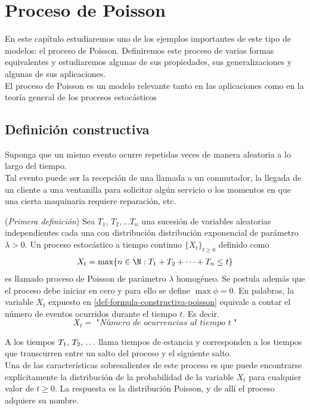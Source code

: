 \section{Proceso de Poisson}
\label{procPoisson-chapter}
En este capítulo estudiaremos uno de los ejemplos
importantes de este tipo de modelos: el proceso de Poisson. Definiremos este proceso de varias formas equivalentes y estudiaremos algunas de sus propiedades, sus generalizaciones y algunas de sus aplicaciones. \\
El proceso de Poisson es un modelo relevante tanto en las aplicaciones como en la teoría general de los procesos estocásticos
\subsection{Definición constructiva}
    Suponga que un mismo evento ocurre repetidas veces de manera aleatoria a lo largo del tiempo.\\
    Tal evento puede ser la recepción de una llamada a un conmutador, la llegada de un cliente a una ventanilla para solicitar algún servicio o los momentos en que una cierta maquinaria requiere reparación, etc.\\
    \begin{Def}(\textit{Primera definición})
        Sea $T_1$, $T_2, \ldots T_n$ una sucesión de variables aleatorias independientes cada una con distribución distribución exponencial de parámetro $\lambda>0$. Un proceso estocástico a tiempo continuo $\{X_t\}_{t\geq 0}$ definido como
        \begin{eqnarray}
            X_t = \max \{ n\in\N : T_1+T_2+\cdots+T_n \leq t\}
            \label{def-formula-constructiva-poisson}
        \end{eqnarray}
        es llamado proceso de Poisson de parámetro $\lambda$ homogéneo.
        Se postula además que el proceso debe iniciar en cero y para ello se define $\max \phi=0$.
        En palabras, la variable $X_t$ expuesto en \ref{def-formula-constructiva-poisson}  equivale a contar el número de eventos ocurridos durante el tiempo $t$. Es decir.
        $$X_t = \textit{ "Número de ocurrencias al tiempo $t$ "}$$
        \label{def-procesoPoison-constructiva}
    \end{Def}
    A los tiempos $T_1 ,\thinspace T_2,\thinspace\ldots$ llama tiempos de estancia y corresponden a los tiempos que transcurren entre un salto del proceso y el siguiente salto.\\
    Una de las características sobresalientes de este proceso es que puede encontrarse explícitamente la distribución de la probabilidad de la variable $X_t$ para cualquier valor de $t\geq 0$. La respuesta es la distribución Poisson, y de allí el proceso adquiere su nombre.
